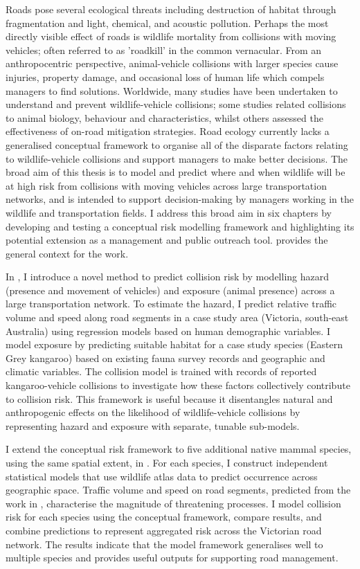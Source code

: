 \documentclass[titlesmallcaps,copyrightpage,examinerscopy]{uomthesis}
\begin{document}
\vspace{1.5cm}
Roads pose several ecological threats including destruction of habitat through fragmentation and light, chemical, and acoustic pollution. Perhaps the most directly visible effect of roads is wildlife mortality from collisions with moving vehicles; often referred to as 'roadkill' in the common vernacular. From an anthropocentric perspective, animal-vehicle collisions with larger species cause injuries, property damage, and occasional loss of human life which compels managers to find solutions. Worldwide, many studies have been undertaken to understand and prevent wildlife-vehicle collisions; some studies related collisions to animal biology, behaviour and characteristics, whilst others assessed the effectiveness of on-road mitigation strategies. Road ecology currently lacks a generalised conceptual framework to organise all of the disparate factors relating to wildlife-vehicle collisions and support managers to make better decisions. The broad aim of this thesis is to model and predict where and when wildlife will be at high risk from collisions with moving vehicles across large transportation networks, and is intended to support decision-making by managers working in the wildlife and transportation fields. I address this broad aim in six chapters by developing and testing a conceptual risk modelling framework and highlighting its potential extension as a management and public outreach tool.  provides the general context for the work.

In , I introduce a novel method to predict collision risk by modelling hazard (presence and movement of vehicles) and exposure (animal presence) across a large transportation network. To estimate the hazard, I predict relative traffic volume and speed along road segments in a case study area (Victoria, south-east Australia) using regression models based on human demographic variables. I model exposure by predicting suitable habitat for a case study species (Eastern Grey kangaroo) based on existing fauna survey records and geographic and climatic variables. The collision model is trained with records of reported kangaroo-vehicle collisions to investigate how these factors collectively contribute to collision risk. This framework is useful because it disentangles natural and anthropogenic effects on the likelihood of wildlife-vehicle collisions by representing hazard and exposure with separate, tunable sub-models.

I extend the conceptual risk framework to five additional native mammal species, using the same spatial extent, in . For each species, I construct independent statistical models that use wildlife atlas data to predict occurrence across geographic space. Traffic volume and speed on road segments, predicted from the work in , characterise the magnitude of threatening processes. I model collision risk for each species using the conceptual framework, compare results, and combine predictions to represent aggregated risk across the Victorian road network. The results indicate that the model framework generalises well to multiple species and provides useful outputs for supporting road management. 
\end{document}
